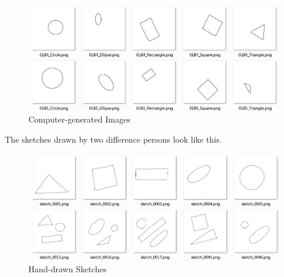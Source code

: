 \begin{figure}[ht!]
\includegraphics[width=\columnwidth]{Figure_1_CG_Image.png}
\caption{Computer-generated Images}
\end{figure}

The sketches drawn by two difference persons look like this.

\begin{figure}[ht!]
\includegraphics[width=\columnwidth]{Figure_2_Sketch_Image.png}
\caption{Hand-drawn Sketches}
\end{figure}


